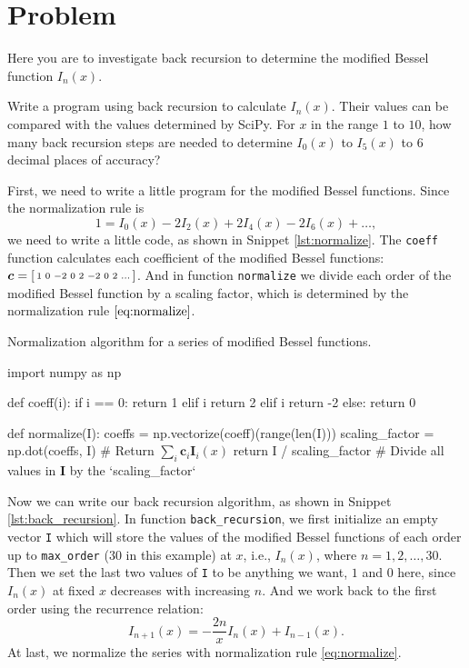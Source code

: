 \section{Problem \thesection}

Here you are to investigate back recursion to determine the modified Bessel function
$I_n(x)$.

\Question Write a program using back recursion to calculate $I_n(x)$.
Their values can be compared with the values determined by SciPy.
For $x$ in the range $1$ to $10$, how many back recursion steps are needed to
determine $I_0(x)$ to $I_5(x)$ to $6$ decimal places of accuracy?

\Answer First, we need to write a little program for the modified Bessel functions.
Since the normalization rule is
%
\begin{equation}\label{eq:normalize}
    1 = I_0(x) - 2 I_2(x) + 2 I_4(x) - 2 I_6(x) + \ldots,
\end{equation}
%
we need to write a little code, as shown in Snippet \ref{lst:normalize}.
The \texttt{coeff} function calculates each coefficient of the
modified Bessel functions: $\bm{c} = \begin{bsmallmatrix}1 & 0 & -2 & 0 & 2 & -2 & 0 & 2 & \ldots\end{bsmallmatrix}$.
And in function \texttt{normalize} we divide each order of the modified Bessel function
by a scaling factor, which is determined by the normalization rule $\eqref{eq:normalize}$.

\begin{algorithm}
    \caption{Normalization algorithm for a series of modified Bessel functions.}
    \label{lst:normalize}
    \begin{pythoncode}
        import numpy as np


        def coeff(i):
            if i == 0:
                return 1
            elif i %
                return 2
            elif i %
                return -2
            else:
                return 0


        def normalize(I):
            coeffs = np.vectorize(coeff)(range(len(I)))
            scaling_factor = np.dot(coeffs, I)  # Return $\sum_i \bm{c}_i \bm{I}_i(x)$
            return I / scaling_factor  # Divide all values in $\bm{I}$ by the `scaling_factor`
    \end{pythoncode}
\end{algorithm}

Now we can write our back recursion algorithm, as shown in Snippet \ref{lst:back_recursion}.
In function \texttt{back\_recursion}, we first initialize an empty vector \texttt{I} which
will store the values of the modified Bessel functions of each order up to
\texttt{max\_order} ($30$ in this example) at $x$, i.e., $I_n(x)$, where
$n = 1, 2, \ldots, 30$.
Then we set the last two values of \texttt{I} to be anything we want, $1$ and $0$ here,
since $I_n(x)$ at fixed $x$ decreases with increasing $n$.
And we work back to the first order using the recurrence relation:
%
\begin{equation}
    I_{n + 1}(x) = -\frac{ 2 n }{ x } I_n(x) + I_{n - 1}(x).
\end{equation}
%
At last, we normalize the series with normalization rule \eqref{eq:normalize}.

